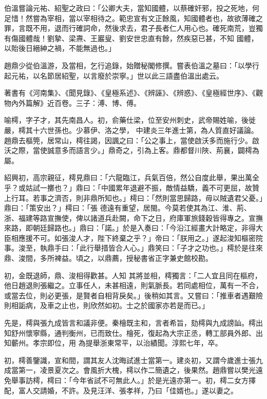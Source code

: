 \begin{pinyinscope}
 伯溫嘗論元祐、紹聖之政曰：「公卿大夫，當知國體，以蔡確奸邪，投之死地，何足惜！然嘗為宰相，當以宰相待之。範忠宣有文正餘風，知國體者也，故欲薄確之罪，言既不用，退而行確詞命，然後求去，君子長者仁人用心也。確死南荒，豈獨有傷國體哉！劉摯、梁燾、王巖叟、劉安世忠直有餘，然疾惡已甚，不知
 國體，以貽後日縉紳之禍，不能無過也。」



 趙鼎少從伯溫游，及當相，乞行追錄，始贈秘閣修撰。嘗表伯溫之墓曰：「以學行起元祐，以名節居紹聖，以言廢於崇寧。」世以此三語盡伯溫出處云。



 著書有《河南集》、《聞見錄》、《皇極系述》、《辨誣》、《辨惑》、《皇極經世序》、《觀物內外篇解》近百卷。三子：溥、博、傅。



 喻樗，字子才，其先南昌人。初，俞藥仕梁，位至安州刺史，武帝賜姓喻，後徙嚴，樗其十六世孫也。少慕伊、洛之學，
 中建炎三年進士第，為人質直好議論。趙鼎去樞筦，居常山，樗往謁，因諷之曰：「公之事上，當使啟沃多而施行少。啟沃之際，當使誠意多而語言少。」鼎奇之，引為上客。鼎都督川陜、荊襄，闢樗為屬。



 紹興初，高宗親征，樗見鼎曰：「六龍臨江，兵氣百倍，然公自度此舉，果出萬全乎？或姑試一擲也？」鼎曰：「中國累年退避不振，敵情益驕，義不可更屈，故贊上行耳。若事之濟否，則非鼎所知也。」樗曰：「然則當思歸路，毋以賊遺君父憂。」鼎曰：「策安出？」樗曰：「張
 德遠有重望，居閩。今莫若使其為江、淮、荊、浙、福建等路宣撫使，俾以諸道兵赴闕，命下之日，府庫軍旅錢穀皆得專之。宣撫來路，即朝廷歸路也。」鼎曰：「諾。」於是入奏曰：「今沿江經畫大計略定，非得大臣相應援不可。如張浚人才，陛下終棄之乎？」帝曰：「朕用之。」遂起浚知樞密院事。浚至，執鼎手曰：「此行舉措皆合人心。」鼎笑曰：「子才之功也。」樗於是往來鼎、浚間，多所裨益。頃之，以鼎薦，授秘書省正字兼史館校勘。



 初，金既退師，鼎、浚相得歡甚。人知
 其將並相，樗獨言：「二人宜且同在樞府，他日趙退則張繼之。立事任人，未甚相遠，則氣脈長。若同處相位，萬有一不合，或當去位，則必更張，是賢者自相背戾矣。」後稍如其言。又嘗曰：「推車者遇艱險則相詬病，及車之止也，則欣然如初。士之於國家亦若是而已。」



 先是，樗與張九成皆言和議非便。秦檜既主和，言者希旨，劾樗與九成謗訕。樗出知舒州懷寧縣，通判衡州，已而致仕。檜死，復起為大宗正丞，轉工部員外郎、出知蘄州。孝宗即位，用
 為提舉浙東常平，以治績聞。淳熙七年，卒。



 初，樗善鑒識，宣和間，謂其友人沈晦試進士當第一。建炎初，又謂今歲進士張九成當第一，凌景夏次之。會風折大槐，樗以作二簡遺之，後果然。趙鼎嘗以樊光遠免舉事訪樗，樗曰：「今年省試不可無此人。」於是光遠亦第一。初，樗二女方擇配，富人交請婚，不許。及見汪洋、張孝祥，乃曰「佳婿也。」遂以妻之。




\end{pinyinscope}
